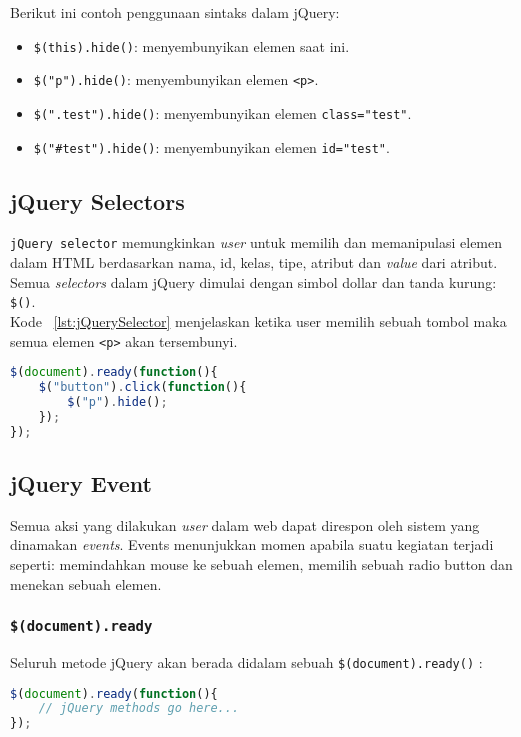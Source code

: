 Berikut ini contoh penggunaan sintaks dalam jQuery:
\begin{itemize}
	\item \texttt{\$(this).hide()}: menyembunyikan elemen saat ini.
	\item \texttt{\$("p").hide()}: menyembunyikan elemen \texttt{<p>}.
	\item \texttt{\$(".test").hide()}: menyembunyikan elemen \texttt{class="test"}.
	\item \texttt{\$("\#test").hide()}: menyembunyikan elemen \texttt{id="test"}.
\end{itemize}
\subsection{jQuery Selectors}
\texttt{jQuery selector} memungkinkan \textit{user} untuk memilih dan memanipulasi elemen dalam HTML berdasarkan nama, id, kelas, tipe, atribut dan \textit{value} dari atribut. Semua \textit{selectors} dalam jQuery dimulai dengan simbol dollar dan tanda kurung: \texttt{\$()}.\\

\noindent Kode ~\ref{lst:jQuerySelector} menjelaskan ketika user memilih sebuah tombol maka semua elemen \texttt{<p>} akan tersembunyi.
\begin{lstlisting}[style=JavaScript, language=JavaScript, basicstyle=\ttfamily, frame=single, columns=fullflexible, keepspaces=true, breaklines=true, showstringspaces=false, label={lst:jQuerySelector}, caption=jQuery Selector pada elemen <p>.]	
$(document).ready(function(){
	$("button").click(function(){
		$("p").hide();
	});
});
\end{lstlisting}

\subsection{jQuery Event}
Semua aksi yang dilakukan \textit{user} dalam web dapat direspon oleh sistem yang dinamakan \textit{events}. Events menunjukkan momen apabila suatu kegiatan terjadi seperti: memindahkan mouse ke sebuah elemen, memilih sebuah radio button dan menekan sebuah elemen.

\subsubsection{\texttt{\$(document).ready}}
Seluruh metode jQuery akan berada didalam sebuah \texttt{\$(document).ready()} :
\begin{lstlisting}[style=JavaScript, language=JavaScript, basicstyle=\ttfamily, frame=single, columns=fullflexible, keepspaces=true, breaklines=true, showstringspaces=false, label={lst:jQueryReady}, caption=jQuery document ready event.]
$(document).ready(function(){
	// jQuery methods go here...
});
\end{lstlisting}

